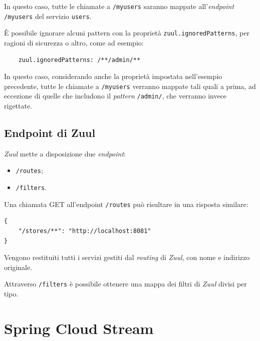 In questo caso, tutte le chiamate a \texttt{/myusers} saranno mappate all'\textit{endpoint} \texttt{/myusers} del servizio \texttt{users}.

È possibile ignorare alcuni pattern con la proprietà \texttt{zuul.ignoredPatterns}, per ragioni di sicurezza o altro, come ad esempio:

\begin{tcolorbox}
	\begin{verbatim}
	zuul.ignoredPatterns: /**/admin/**
	\end{verbatim}
\end{tcolorbox}

In questo caso, considerando anche la proprietà impostata nell'esempio precedente, tutte le chiamate a \texttt{/myusers} verranno mappate tali quali a prima, ad eccezione di quelle che includono il \textit{pattern} \texttt{/admin/}, che verranno invece rigettate.

\subsection{Endpoint di Zuul} \textit{Zuul} mette a disposizione due \textit{endpoint}:
\begin{itemize}
	\item \texttt{/routes};
	\item \texttt{/filters}.
\end{itemize}

Una chiamata GET all'endpoint \texttt{/routes} può risultare in una risposta similare:

\begin{tcolorbox}
	\begin{verbatim}
{
    "/stores/**": "http://localhost:8081"
}
	\end{verbatim}
\end{tcolorbox}

Vengono restituiti tutti i servizi gestiti dal \textit{routing} di \textit{Zuul}, con nome e indirizzo originale.

Attraverso \texttt{/filters} è possibile ottenere una mappa dei filtri di \textit{Zuul} divisi per tipo.


\section{Spring Cloud Stream}

